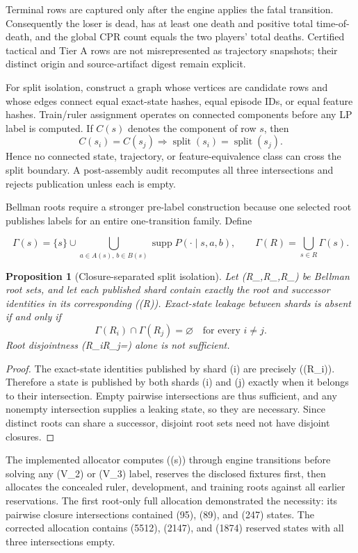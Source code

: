 \documentclass[11pt]{article}
\newtheorem{proposition}{Proposition}
\begin{document}
Terminal rows are captured only after the engine applies the fatal transition.
Consequently the loser is dead, has at least one death and positive total
time-of-death, and the global CPR count equals the two players' total deaths.
Certified tactical and Tier A rows are not misrepresented as trajectory
snapshots; their distinct origin and source-artifact digest remain explicit.

For split isolation, construct a graph whose vertices are candidate rows and
whose edges connect equal exact-state hashes, equal episode IDs, or equal
feature hashes. Train/ruler assignment operates on connected components before
any LP label is computed. If \(C(s)\) denotes the component of row \(s\), then
\[
C(s_i)=C(s_j)\Longrightarrow
\operatorname{split}(s_i)=\operatorname{split}(s_j).
\]
Hence no connected state, trajectory, or feature-equivalence class can cross
the split boundary. A post-assembly audit recomputes all three intersections
and rejects publication unless each is empty.

Bellman roots require a stronger pre-label construction because one selected
root publishes labels for an entire one-transition family. Define

\[
 \Gamma(s)=\{s\}\cup
 \bigcup_{a\in A(s),\,b\in B(s)}
 \operatorname{supp}P(\cdot\mid s,a,b),
 \qquad
 \Gamma(R)=\bigcup_{s\in R}\Gamma(s).
\]

\begin{proposition}[Closure-separated split isolation]
Let (R_{},R_{},R_{}) be Bellman root sets,
and let each published shard contain exactly the root and successor identities
in its corresponding (\Gamma(R)). Exact-state leakage between shards is absent
if and only if
\[
 \Gamma(R_i)\cap\Gamma(R_j)=\varnothing
 \quad\text{for every }i\neq j.
\]
Root disjointness (R_i\cap R_j=\varnothing) alone is not sufficient.
\end{proposition}
\begin{proof}
The exact-state identities published by shard (i) are precisely
(\Gamma(R_i)). Therefore a state is published by both shards (i) and (j)
exactly when it belongs to their intersection. Empty pairwise intersections are
thus sufficient, and any nonempty intersection supplies a leaking state, so
they are necessary. Since distinct roots can share a successor, disjoint root
sets need not have disjoint closures.
\end{proof}

The implemented allocator computes (\Gamma(s)) through engine transitions
before solving any (V_2) or (V_3) label, reserves the disclosed fixtures
first, then allocates the concealed ruler, development, and training roots
against all earlier reservations. The first root-only full allocation
demonstrated the necessity: its pairwise closure intersections contained
(95), (89), and (247) states. The corrected allocation contains
(5512), (2147), and (1874) reserved states with all three intersections
empty.
\end{document}
